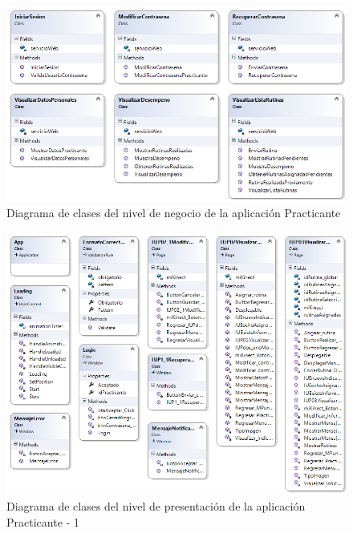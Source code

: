 \begin{figure}[H]
	\begin{center}
		\includegraphics[scale=0.85]{./Figuras/Arquitectura/Negocio_Practicante}
	\end{center}
	\caption{Diagrama de clases del nivel de negocio de la aplicación Practicante}
	\label{fig:DCP_Negocio}
\end{figure}

\begin{figure}[H]
	\begin{center}
		\includegraphics[scale=0.80]{./Figuras/Arquitectura/Presentacion_Practicante1}
	\end{center}
	\caption{Diagrama de clases del nivel de presentación de la aplicación Practicante - 1}
	\label{fig:DCP_Presentacion1}
\end{figure}

